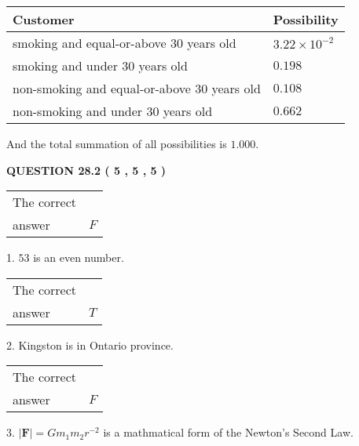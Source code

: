 \documentclass[12pt]{article}
\begin{document}
  
 
 
\noindent{}

 
\noindent
\begin{tabular}{|l|l|}
\hline
Customer & Possibility \\
\hline
smoking  and  %
equal-or-above 30 years old &
  $ %
3.22 \times 10^{-2}$ \\
\hline
smoking  and  %
under 30 years old &
  $ %
0.198$ \\
\hline
 non-smoking and  %
equal-or-above 30 years old &
  $ %
0.108$ \\
\hline
 non-smoking and  %
under 30 years old &
  $ %
0.662$ \\
\hline
\end{tabular}
 
\noindent
 And the total summation of all possibilities is $  %
1.000 $.
 
 
 
  
\vspace{0.2in}
  
{\textbf{\Large{QUESTION
28.2 
 (           5 ,           5 ,           5 )
}}}
  
  
 
 
\noindent{}

 
\noindent\begin{tabular}{|l|l|}\hline The correct & \\
          answer &  %
$F$ \\ \hline \end{tabular}
1. $ %
53$ is an  %
even number.
 
\noindent\begin{tabular}{|l|l|}\hline The correct & \\
          answer &  %
$T$ \\ \hline \end{tabular}
2.  %
Kingston is in  %
Ontario province.
 
\noindent\begin{tabular}{|l|l|}\hline The correct & \\
          answer &  %
$F$ \\ \hline \end{tabular}
3.  %
$\left| \mathbf{F}\right| =Gm_1m_2r^{-2}$ is a mathmatical form of  %
the Newton's Second Law.
 
 
 
  
\vspace{0.2in}
  
\end{document}
